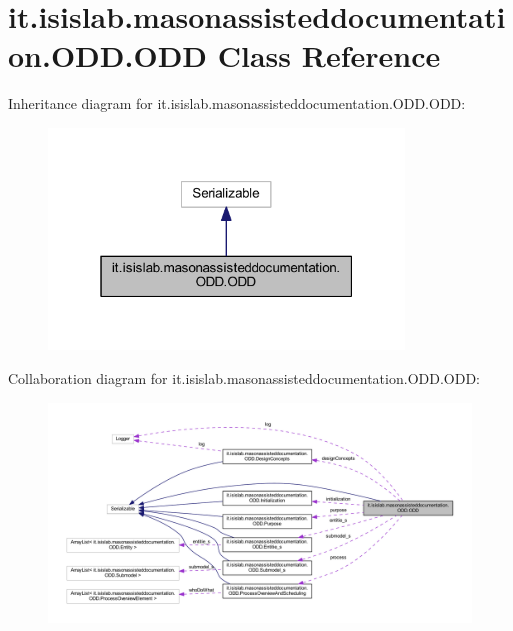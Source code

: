 \hypertarget{classit_1_1isislab_1_1masonassisteddocumentation_1_1_o_d_d_1_1_o_d_d}{\section{it.\-isislab.\-masonassisteddocumentation.\-O\-D\-D.\-O\-D\-D Class Reference}
\label{classit_1_1isislab_1_1masonassisteddocumentation_1_1_o_d_d_1_1_o_d_d}
}


Inheritance diagram for it.\-isislab.\-masonassisteddocumentation.\-O\-D\-D.\-O\-D\-D\-:
\nopagebreak
\begin{figure}[H]
\begin{center}
\leavevmode
\includegraphics[width=268pt]{classit_1_1isislab_1_1masonassisteddocumentation_1_1_o_d_d_1_1_o_d_d__inherit__graph}
\end{center}
\end{figure}


Collaboration diagram for it.\-isislab.\-masonassisteddocumentation.\-O\-D\-D.\-O\-D\-D\-:
\nopagebreak
\begin{figure}[H]
\begin{center}
\leavevmode
\includegraphics[width=350pt]{classit_1_1isislab_1_1masonassisteddocumentation_1_1_o_d_d_1_1_o_d_d__coll__graph}
\end{center}
\end{figure}
